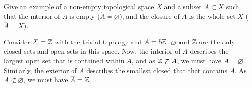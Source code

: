 \documentclass[a4paper, answers]{exam}
\begin{document}
\begin{questions}
	\question Give an example of a non-empty topological space $X$ and a subset
	$A \subset X$ such that the interior of $A$ is empty 
	($\mathring A = \varnothing$), and the closure of $A$ is the whole set $X$
	($\overline A = X$).
	\begin{solution}
		Consider $X = \mathbb{Z}$ with the trivial topology and $A = 5 \mathbb{Z}$.
		$\varnothing$ and $\mathbb{Z}$ are the only closed sets and open sets in this
		space.
		Now, the interior of $A$ describes the largest open set that is contained
		within $A$, and as $\mathbb{Z} \not\subset A$, we must have 
		$\mathring A = \varnothing$.
		Similarly, the exterior of $A$ describes the smallest closed that that
		contains $A$. 
		As $A \not\subset \varnothing$, we must have $\overline A = \mathbb{Z}$.
	\end{solution}
\end{questions}
\end{document}
